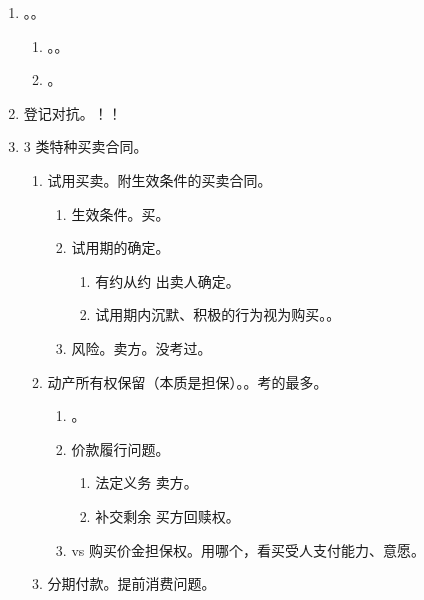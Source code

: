 \begin{enumerate}
  \item {}。。
        \begin{enumerate}
          \item {}。。
          \item {}。
        \end{enumerate}
  \item 登记对抗。！！
  \item 3 类特种买卖合同。
        \begin{enumerate}
          \item 试用买卖。附生效条件的买卖合同。
                \begin{enumerate}
                  \item 生效条件。买。
                  \item 试用期的确定。
                        \begin{enumerate}
                          \item 有约从约 \yjt 出卖人确定。
                          \item 试用期内沉默、积极的行为视为购买。。
                        \end{enumerate}
                  \item 风险。卖方。没考过。
                \end{enumerate}
          \item 动产所有权保留（本质是担保）。。考的最多。
                \begin{enumerate}
                  \item {}。
                  \item 价款履行问题。
                        \begin{enumerate}
                          \item {} \yjt 法定义务 \yjt 卖方。
                          \item \sjt 补交剩余 \yjt 买方回赎权。
                        \end{enumerate}
                  \item vs 购买价金担保权。用哪个，看买受人支付能力、意愿。
                \end{enumerate}
          \item 分期付款。提前消费问题。

\end{enumerate}
\end{enumerate}
